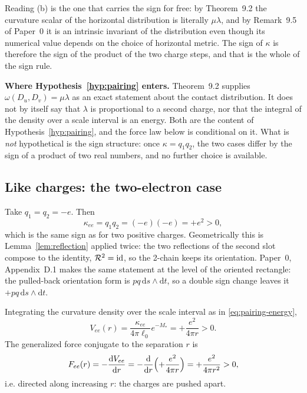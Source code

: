 Reading (b) is the one that carries the sign for free: by Theorem~9.2 the
curvature scalar of the horizontal distribution is literally $\mu\lambda$, and by
Remark~9.5 of Paper~0 it is an intrinsic invariant of the distribution even
though its numerical value depends on the choice of horizontal metric.  The sign
of $\kappa$ is therefore the sign of the product of the two charge steps, and
that is the whole of the sign rule.

\begin{statusbox}
\textbf{Where Hypothesis~\ref{hyp:pairing} enters.}  Theorem~9.2 supplies
$\omega(D_u,D_v)=\mu\lambda$ as an exact statement about the contact
distribution.  It does not by itself say that $\lambda$ is proportional to a
second charge, nor that the integral of the density over a scale interval is an
energy.  Both are the content of Hypothesis~\ref{hyp:pairing}, and the force law
below is conditional on it.  What is \emph{not} hypothetical is the sign
structure: once $\kappa=q_1q_2$, the two cases differ by the sign of a product
of two real numbers, and no further choice is available.
\end{statusbox}

\subsection{Like charges: the two-electron case}

Take $q_1=q_2=-e$.  Then
\begin{equation}\label{eq:kappa-ee}
  \kappa_{ee}=q_1q_2=(-e)(-e)=+e^{2}>0,
\end{equation}
which is the same sign as for two positive charges.  Geometrically this is
Lemma~\ref{lem:reflection} applied twice: the two reflections of the second
slot compose to the identity, $\mathcal R^2=\operatorname{id}$, so the 2-chain keeps its
orientation.  Paper~0, Appendix~D.1 makes the same statement at the level of the
oriented rectangle: the pulled-back orientation form is $pq\,\mathrm ds\wedge
\mathrm dt$, so a double sign change leaves it $+pq\,\mathrm ds\wedge\mathrm dt$.

Integrating the curvature density over the scale interval as in
\eqref{eq:pairing-energy},
\begin{equation}\label{eq:V-ee}
  V_{ee}(r)=\frac{\kappa_{ee}}{4\pi\ell_0}e^{-M_*}=+\frac{e^{2}}{4\pi r}>0 .
\end{equation}
The generalized force conjugate to the separation $r$ is
\begin{equation}\label{eq:F-ee}
  F_{ee}(r)=-\frac{\mathrm dV_{ee}}{\mathrm dr}
  =-\frac{\mathrm d}{\mathrm dr}\Bigl(+\frac{e^{2}}{4\pi r}\Bigr)
  =+\frac{e^{2}}{4\pi r^{2}}>0,
\end{equation}
i.e. directed along increasing $r$: the charges are pushed apart.

